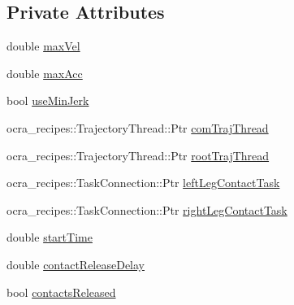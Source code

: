 \subsection*{\-Private \-Attributes}
\begin{DoxyCompactItemize}
\item 
double \hyperlink{classStandingDemoClient_a638e427aef4c4dc6fa38081ab5f9f405}{max\-Vel}
\item 
double \hyperlink{classStandingDemoClient_abc06fc0343cbca7a3faac4dbb1eaa842}{max\-Acc}
\item 
bool \hyperlink{classStandingDemoClient_a47132d5336d2e3b02085d2f153db6385}{use\-Min\-Jerk}
\item 
ocra\-\_\-recipes\-::\-Trajectory\-Thread\-::\-Ptr \hyperlink{classStandingDemoClient_a223aa634ceba696716779461ec1d3f63}{com\-Traj\-Thread}
\item 
ocra\-\_\-recipes\-::\-Trajectory\-Thread\-::\-Ptr \hyperlink{classStandingDemoClient_a4f84e52d8be94fb7fae7a6c0ad8e8adb}{root\-Traj\-Thread}
\item 
ocra\-\_\-recipes\-::\-Task\-Connection\-::\-Ptr \hyperlink{classStandingDemoClient_ad5dfa4632f03e75095c810b6ff2301b4}{left\-Leg\-Contact\-Task}
\item 
ocra\-\_\-recipes\-::\-Task\-Connection\-::\-Ptr \hyperlink{classStandingDemoClient_ad53b834a0927d48917f5b6e830feb0f8}{right\-Leg\-Contact\-Task}
\item 
double \hyperlink{classStandingDemoClient_af05ac205216c20f9780f7e48a9ee4648}{start\-Time}
\item 
double \hyperlink{classStandingDemoClient_a4a13f8bdbc84e3645c7a1ab69012c652}{contact\-Release\-Delay}
\item 
bool \hyperlink{classStandingDemoClient_ac6744005797ac8071776a68b35a7da6d}{contacts\-Released}
\end{DoxyCompactItemize}


